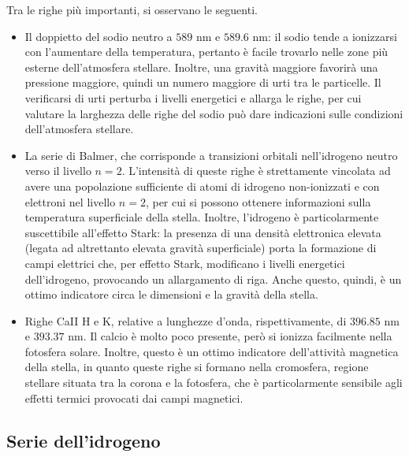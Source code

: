\documentclass[11pt, a4paper]{scrartcl}
\theoremstyle{style}
\theoremstyle{style1}
\numberwithin{equation}{subsection}
\begin{document}
\noindent Tra le righe pi\`u importanti, si osservano le seguenti.
\begin{itemize}
	\item Il doppietto del sodio neutro a $589$ nm e $589.6$ nm: il sodio tende a ionizzarsi con l'aumentare della temperatura, pertanto \`e facile trovarlo nelle zone pi\`u esterne dell'atmosfera stellare. 
		Inoltre, una gravit\`a maggiore favorir\`a una pressione maggiore, quindi un numero maggiore di urti tra le particelle. 
		Il verificarsi di urti perturba i livelli energetici e allarga le righe, per cui valutare la larghezza delle righe del sodio pu\`o dare indicazioni sulle condizioni dell'atmosfera stellare.
	\item La serie di Balmer, che corrisponde a transizioni orbitali nell'idrogeno neutro verso il livello $n=2$.
		L'intensit\`a di queste righe \`e strettamente vincolata ad avere una popolazione sufficiente di atomi di idrogeno non-ionizzati e con elettroni nel livello $n=2$, per cui si possono ottenere informazioni sulla temperatura superficiale della stella.
		Inoltre, l'idrogeno \`e particolarmente suscettibile all'effetto Stark: la presenza di una densit\`a elettronica elevata (legata ad altrettanto elevata gravit\`a superficiale) porta la formazione di campi elettrici che, per effetto Stark, modificano i livelli energetici dell'idrogeno, provocando un allargamento di riga.
		Anche questo, quindi, \`e un ottimo indicatore circa le dimensioni e la gravit\`a della stella.
	\item Righe CaII H e K, relative a lunghezze d'onda, rispettivamente, di $396.85$ nm e $393.37$ nm.
		Il calcio \`e molto poco presente, per\`o si ionizza facilmente nella fotosfera solare. 
		Inoltre, questo \`e un ottimo indicatore dell'attivit\`a magnetica della stella, in quanto queste righe si formano nella cromosfera, regione stellare situata tra la corona e la fotosfera, che \`e particolarmente sensibile agli effetti termici provocati dai campi magnetici.
\end{itemize}
\subsection{Serie dell'idrogeno}
\end{document}
